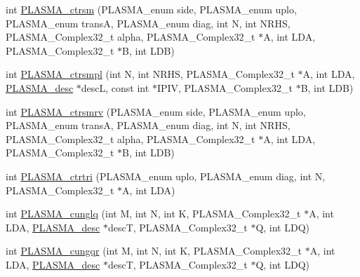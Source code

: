 \begin{DoxyCompactItemize}
\item 
int \hyperlink{group__PLASMA__Complex32__t_ga59907687253f7978f60e1d56d6fe941c_ga59907687253f7978f60e1d56d6fe941c}{P\+L\+A\+S\+M\+A\+\_\+ctrsm} (P\+L\+A\+S\+M\+A\+\_\+enum side, P\+L\+A\+S\+M\+A\+\_\+enum uplo, P\+L\+A\+S\+M\+A\+\_\+enum trans\+A, P\+L\+A\+S\+M\+A\+\_\+enum diag, int N, int N\+R\+H\+S, P\+L\+A\+S\+M\+A\+\_\+\+Complex32\+\_\+t alpha, P\+L\+A\+S\+M\+A\+\_\+\+Complex32\+\_\+t $\ast$A, int L\+D\+A, P\+L\+A\+S\+M\+A\+\_\+\+Complex32\+\_\+t $\ast$B, int L\+D\+B)
\item 
int \hyperlink{group__PLASMA__Complex32__t_ga6f1a79fbd5420d08a1c0668c5f475f4f_ga6f1a79fbd5420d08a1c0668c5f475f4f}{P\+L\+A\+S\+M\+A\+\_\+ctrsmpl} (int N, int N\+R\+H\+S, P\+L\+A\+S\+M\+A\+\_\+\+Complex32\+\_\+t $\ast$A, int L\+D\+A, \hyperlink{structplasma__desc__t}{P\+L\+A\+S\+M\+A\+\_\+desc} $\ast$desc\+L, const int $\ast$I\+P\+I\+V, P\+L\+A\+S\+M\+A\+\_\+\+Complex32\+\_\+t $\ast$B, int L\+D\+B)
\item 
int \hyperlink{group__PLASMA__Complex32__t_ga4932d66d31f7970a6cab8381d373eb12_ga4932d66d31f7970a6cab8381d373eb12}{P\+L\+A\+S\+M\+A\+\_\+ctrsmrv} (P\+L\+A\+S\+M\+A\+\_\+enum side, P\+L\+A\+S\+M\+A\+\_\+enum uplo, P\+L\+A\+S\+M\+A\+\_\+enum trans\+A, P\+L\+A\+S\+M\+A\+\_\+enum diag, int N, int N\+R\+H\+S, P\+L\+A\+S\+M\+A\+\_\+\+Complex32\+\_\+t alpha, P\+L\+A\+S\+M\+A\+\_\+\+Complex32\+\_\+t $\ast$A, int L\+D\+A, P\+L\+A\+S\+M\+A\+\_\+\+Complex32\+\_\+t $\ast$B, int L\+D\+B)
\item 
int \hyperlink{group__PLASMA__Complex32__t_ga25e718997c7c1fd6f599d7b3a04fddad_ga25e718997c7c1fd6f599d7b3a04fddad}{P\+L\+A\+S\+M\+A\+\_\+ctrtri} (P\+L\+A\+S\+M\+A\+\_\+enum uplo, P\+L\+A\+S\+M\+A\+\_\+enum diag, int N, P\+L\+A\+S\+M\+A\+\_\+\+Complex32\+\_\+t $\ast$A, int L\+D\+A)
\item 
int \hyperlink{group__PLASMA__Complex32__t_gad8f450a6bb48fac4dc912211fef0e912_gad8f450a6bb48fac4dc912211fef0e912}{P\+L\+A\+S\+M\+A\+\_\+cunglq} (int M, int N, int K, P\+L\+A\+S\+M\+A\+\_\+\+Complex32\+\_\+t $\ast$A, int L\+D\+A, \hyperlink{structplasma__desc__t}{P\+L\+A\+S\+M\+A\+\_\+desc} $\ast$desc\+T, P\+L\+A\+S\+M\+A\+\_\+\+Complex32\+\_\+t $\ast$Q, int L\+D\+Q)
\item 
int \hyperlink{group__PLASMA__Complex32__t_ga6c696165c8c276260ba80eff16e4d291_ga6c696165c8c276260ba80eff16e4d291}{P\+L\+A\+S\+M\+A\+\_\+cungqr} (int M, int N, int K, P\+L\+A\+S\+M\+A\+\_\+\+Complex32\+\_\+t $\ast$A, int L\+D\+A, \hyperlink{structplasma__desc__t}{P\+L\+A\+S\+M\+A\+\_\+desc} $\ast$desc\+T, P\+L\+A\+S\+M\+A\+\_\+\+Complex32\+\_\+t $\ast$Q, int L\+D\+Q)

\end{DoxyCompactItemize}
